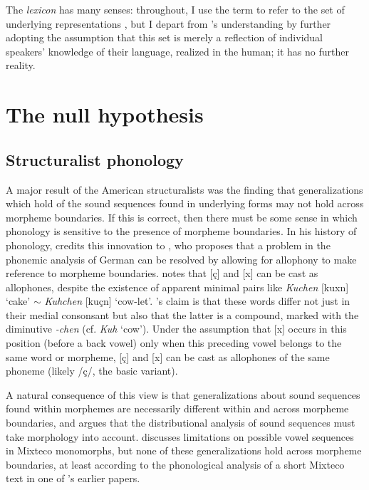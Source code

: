 The \emph{lexicon} has many senses: throughout, I use the term to refer to the set of underlying representations \citep[][269]{LANGUAGE}, but I depart from \citeauthor{LANGUAGE}'s understanding by further adopting the assumption that this set is merely a reflection of individual speakers' knowledge of their language, realized in the human; it has no further reality.

\section{The null hypothesis}

\subsection{Structuralist phonology}

A major result of the American structuralists was the finding that generalizations which hold of the sound sequences found in underlying forms may not hold across morpheme boundaries. If this is correct, then there must be some sense in which phonology is sensitive to the presence of morpheme boundaries. In his history of phonology, \citet[][267]{Anderson1985} credits this innovation to \citet{Bloomfield1930}, who proposes that a problem in the phonemic analysis of German can be resolved by allowing for allophony to make reference to morpheme boundaries. \citeauthor{Bloomfield1930} notes that [\c{c}] and [x] can be cast as allophones, despite the existence of apparent minimal pairs like \emph{Kuchen} [ku\lm x\textschwa n] `cake' $\sim$ \emph{Kuhchen} [ku\lm\c{c}\textschwa n] `cow-let'. \citeauthor{Bloomfield1930}'s claim is that these words differ not just in their medial consonsant but also that the latter is a compound, marked with the diminutive \emph{-chen} (cf. \emph{Kuh} `cow'). Under the assumption that [x] occurs in this position (before a back vowel) only when this preceding vowel belongs to the same word or morpheme, [\c{c}] and [x] can be cast as allophones of the same phoneme (likely /\c{c}/, the basic variant). 

A natural consequence of this view is that generalizations about sound sequences found within morphemes are necessarily different within and across morpheme boundaries, and \citet{Pike1947b} argues that the distributional analysis of sound sequences must take morphology into account. \citeauthor{Pike1947b} discusses limitations on possible vowel sequences in Mixteco monomorphs, but none of these generalizations hold across morpheme boundaries, at least according to the phonological analysis of a short Mixteco text in one of \citeauthor{Pike1944}'s earlier papers.

